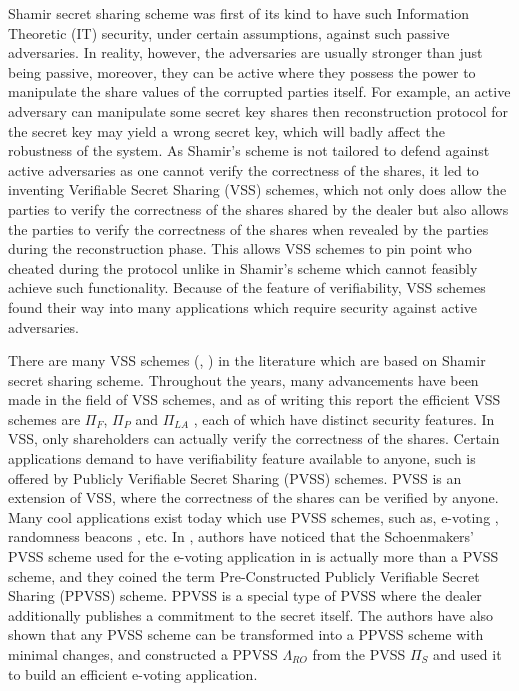 Shamir secret sharing scheme was first of its kind to have such Information Theoretic (IT) security, 
under certain assumptions, against such passive adversaries. In reality, however, the adversaries 
are usually stronger than just being passive, moreover, they can be active where they 
possess the power to manipulate the share values of the corrupted parties itself. For example, 
an active adversary can manipulate some secret key shares then reconstruction protocol 
for the secret key may yield a wrong secret key, which will badly affect the robustness 
of the system. As Shamir's scheme is not tailored to defend against active adversaries as one cannot 
verify the correctness of the shares, it led to inventing Verifiable 
Secret Sharing (VSS) schemes, which not only does allow the parties to verify the 
correctness of the shares shared by the dealer but also allows the parties to verify 
the correctness of the shares when revealed by the parties during the reconstruction 
phase. This allows VSS schemes to pin point who cheated during the protocol unlike 
in Shamir's scheme which cannot feasibly achieve such functionality. 
Because of the feature of verifiability, VSS schemes found their way into 
many applications which require security against active adversaries.\par

There are many VSS schemes (\cite{d053b0be49644b2f932d703db8c1f8a0}, \cite{DBLP:conf/focs/Feldman87}) 
in the literature which are based on Shamir secret sharing scheme. Throughout the years, many advancements 
have been made in the field of VSS schemes, and as of writing this report the efficient VSS schemes are 
$\Pi_F$, $\Pi_P$ and $\Pi_{LA}$ \cite{cryptoeprint:2023/1669}, each of which have distinct security features. 
In VSS, only shareholders can actually verify the correctness of the shares. Certain applications demand 
to have verifiability feature available to anyone, such is offered by Publicly Verifiable Secret Sharing (PVSS) 
schemes. PVSS is an extension of VSS, where the correctness of the shares can be verified by anyone. Many 
cool applications exist today which use PVSS schemes, such as, e-voting \cite{5581ccd9530540479539d21d1d39ae96}, 
randomness beacons \cite{cryptoeprint:2017/216}, etc. In \cite{cryptoeprint:2025/576}, authors have noticed 
that the Schoenmakers' PVSS scheme used for the e-voting application in \cite{5581ccd9530540479539d21d1d39ae96} 
is actually more than a PVSS scheme, and they coined the term Pre-Constructed Publicly Verifiable Secret Sharing (PPVSS) scheme. 
PPVSS is a special type of PVSS where the dealer additionally publishes a commitment to the secret itself. 
The authors have also shown that any PVSS scheme can be transformed into a PPVSS scheme with minimal 
changes, and constructed a PPVSS $\Lambda_{RO}$ from the PVSS $\Pi_S$ \cite{cryptoeprint:2023/1669} and 
used it to build an efficient e-voting application.\par 

